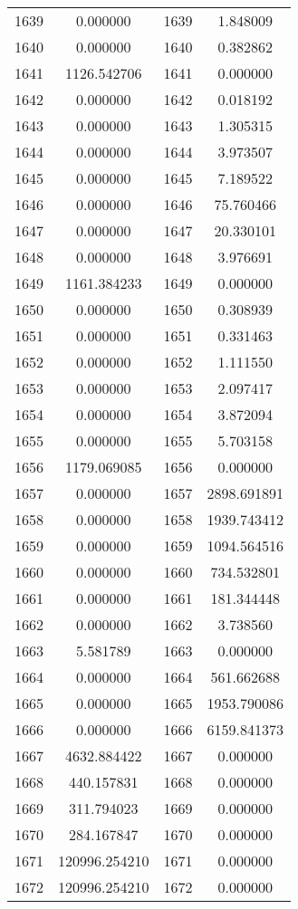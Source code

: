 \documentclass[12pt]{article}
\begin{document}
\begin{longtable}{@{}cccc@{}}
1639 & 0.000000 & 1639 & 1.848009 \\
1640 & 0.000000 & 1640 & 0.382862 \\
1641 & 1126.542706 & 1641 & 0.000000 \\
1642 & 0.000000 & 1642 & 0.018192 \\
1643 & 0.000000 & 1643 & 1.305315 \\
1644 & 0.000000 & 1644 & 3.973507 \\
1645 & 0.000000 & 1645 & 7.189522 \\
1646 & 0.000000 & 1646 & 75.760466 \\
1647 & 0.000000 & 1647 & 20.330101 \\
1648 & 0.000000 & 1648 & 3.976691 \\
1649 & 1161.384233 & 1649 & 0.000000 \\
1650 & 0.000000 & 1650 & 0.308939 \\
1651 & 0.000000 & 1651 & 0.331463 \\
1652 & 0.000000 & 1652 & 1.111550 \\
1653 & 0.000000 & 1653 & 2.097417 \\
1654 & 0.000000 & 1654 & 3.872094 \\
1655 & 0.000000 & 1655 & 5.703158 \\
1656 & 1179.069085 & 1656 & 0.000000 \\
1657 & 0.000000 & 1657 & 2898.691891 \\
1658 & 0.000000 & 1658 & 1939.743412 \\
1659 & 0.000000 & 1659 & 1094.564516 \\
1660 & 0.000000 & 1660 & 734.532801 \\
1661 & 0.000000 & 1661 & 181.344448 \\
1662 & 0.000000 & 1662 & 3.738560 \\
1663 & 5.581789 & 1663 & 0.000000 \\
1664 & 0.000000 & 1664 & 561.662688 \\
1665 & 0.000000 & 1665 & 1953.790086 \\
1666 & 0.000000 & 1666 & 6159.841373 \\
1667 & 4632.884422 & 1667 & 0.000000 \\
1668 & 440.157831 & 1668 & 0.000000 \\
1669 & 311.794023 & 1669 & 0.000000 \\
1670 & 284.167847 & 1670 & 0.000000 \\
1671 & 120996.254210 & 1671 & 0.000000 \\
1672 & 120996.254210 & 1672 & 0.000000 \\

\end{longtable}
\end{document}
